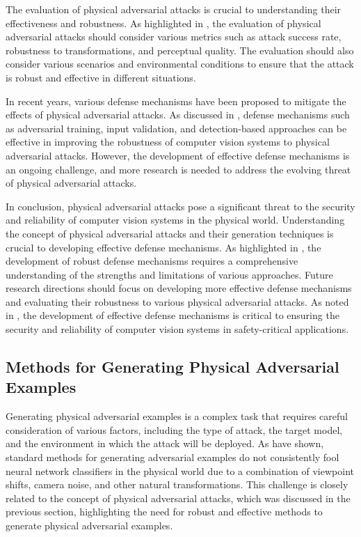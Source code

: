\documentclass[11pt,a4paper]{article}
\begin{document}
The evaluation of physical adversarial attacks is crucial to understanding their effectiveness and robustness. As highlighted in \cite{doi:10.1109/jiot.2021.3099164}, the evaluation of physical adversarial attacks should consider various metrics such as attack success rate, robustness to transformations, and perceptual quality. The evaluation should also consider various scenarios and environmental conditions to ensure that the attack is robust and effective in different situations.

In recent years, various defense mechanisms have been proposed to mitigate the effects of physical adversarial attacks. As discussed in \cite{doi:10.1016/j.eng.2019.12.012}, defense mechanisms such as adversarial training, input validation, and detection-based approaches can be effective in improving the robustness of computer vision systems to physical adversarial attacks. However, the development of effective defense mechanisms is an ongoing challenge, and more research is needed to address the evolving threat of physical adversarial attacks.

In conclusion, physical adversarial attacks pose a significant threat to the security and reliability of computer vision systems in the physical world. Understanding the concept of physical adversarial attacks and their generation techniques is crucial to developing effective defense mechanisms. As highlighted in \cite{doi:10.1609/aaai.v32i1.12341}, the development of robust defense mechanisms requires a comprehensive understanding of the strengths and limitations of various approaches. Future research directions should focus on developing more effective defense mechanisms and evaluating their robustness to various physical adversarial attacks. As noted in \cite{doi:10.1109/cvpr42600.2020.00108}, the development of effective defense mechanisms is critical to ensuring the security and reliability of computer vision systems in safety-critical applications.


\subsection{Methods for Generating Physical Adversarial Examples}


Generating physical adversarial examples is a complex task that requires careful consideration of various factors, including the type of attack, the target model, and the environment in which the attack will be deployed. As \cite{arxiv:1707.07397} have shown, standard methods for generating adversarial examples do not consistently fool neural network classifiers in the physical world due to a combination of viewpoint shifts, camera noise, and other natural transformations. This challenge is closely related to the concept of physical adversarial attacks, which was discussed in the previous section, highlighting the need for robust and effective methods to generate physical adversarial examples.
\end{document}
